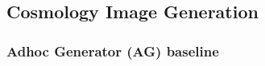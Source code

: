 \documentclass[10pt,conference,compsocconf]{IEEEtran}
\begin{document}




\subsection{Cosmology Image Generation}

\subsubsection{Adhoc Generator (AG) baseline} 
\label{subsubsec: adhoc} %
\end{document}
